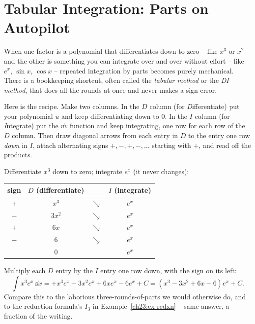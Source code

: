 \section{Tabular Integration: Parts on Autopilot}
\label{ch23:tabular}

When one factor is a polynomial that differentiates down to zero -- like $x^3$ or
$x^2$ -- and the other is something you can integrate over and over without effort
-- like $e^x$, $\sin x$, $\cos x$ -- repeated integration by parts becomes purely
mechanical. There is a bookkeeping shortcut, often called the \emph{tabular
method} or the \emph{DI method}, that does all the rounds at once and never makes
a sign error.

Here is the recipe. Make two columns. In the $D$ column (for
\emph{D}ifferentiate) put your polynomial $u$ and keep differentiating down to
$0$. In the $I$ column (for \emph{I}ntegrate) put the $\dd v$ function and keep
integrating, one row for each row of the $D$ column. Then draw diagonal arrows
from each entry in $D$ to the entry one row \emph{down} in $I$, attach alternating
signs $+,-,+,-,\dots$ starting with $+$, and read off the products.

\begin{example}
\label{ch23:ex-tabx3}
Differentiate $x^3$ down to zero; integrate $e^x$ (it never changes):
\begin{center}
\begin{tabular}{c c c c}
\toprule
sign & $D$ (differentiate) & & $I$ (integrate) \\
\midrule
$+$ & $x^3$ & $\searrow$ & $e^x$ \\
$-$ & $3x^2$ & $\searrow$ & $e^x$ \\
$+$ & $6x$ & $\searrow$ & $e^x$ \\
$-$ & $6$ & $\searrow$ & $e^x$ \\
& $0$ & & $e^x$ \\
\bottomrule
\end{tabular}
\end{center}
Multiply each $D$ entry by the $I$ entry one row down, with the sign on its left:
\[
\int x^3 e^x\,\dd x
= +x^3 e^x - 3x^2 e^x + 6x e^x - 6 e^x + C
= (x^3 - 3x^2 + 6x - 6)e^x + C.
\]
Compare this to the laborious three-rounds-of-parts we would otherwise do, and to
the reduction formula's $I_3$ in Example~\ref{ch23:ex-redxn} -- same answer, a
fraction of the writing.
\end{example}

